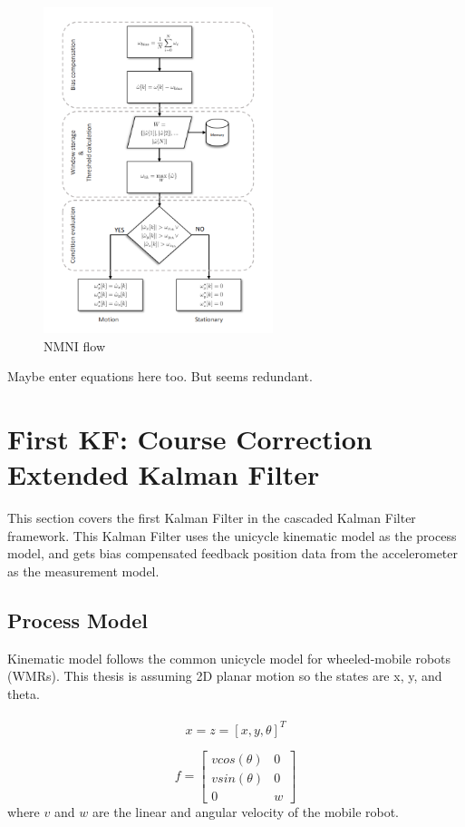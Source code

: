 \begin{figure}
  \centerline{\includegraphics[height=95mm]{temp_NMNI.PNG}}
  \caption[NMNI Flow]{
    NMNI flow
    }
  \label{fig:NMNI}
\end{figure}

Maybe enter equations here too. But seems redundant.


\section{First KF: Course Correction Extended Kalman Filter}

This section covers the first Kalman Filter in the cascaded Kalman Filter framework.
This Kalman Filter uses the unicycle kinematic model as the process model, and gets
bias compensated feedback position data from the accelerometer as the measurement 
model. 

\subsection{Process Model}

Kinematic model follows the common unicycle model for wheeled-mobile robots (WMRs).
This thesis is assuming 2D planar motion so the states are x, y, and theta.
\\ \\
\begin{equation}
  x = z = [x, y, \theta]^T
\end{equation}

\begin{equation}
  f = \begin{bmatrix}
        vcos(\theta) & 0 \\
        vsin(\theta) & 0 \\
              0      & w
      \end{bmatrix}
\end{equation}
where $v$ and $w$ are the linear and angular velocity of the mobile robot.

